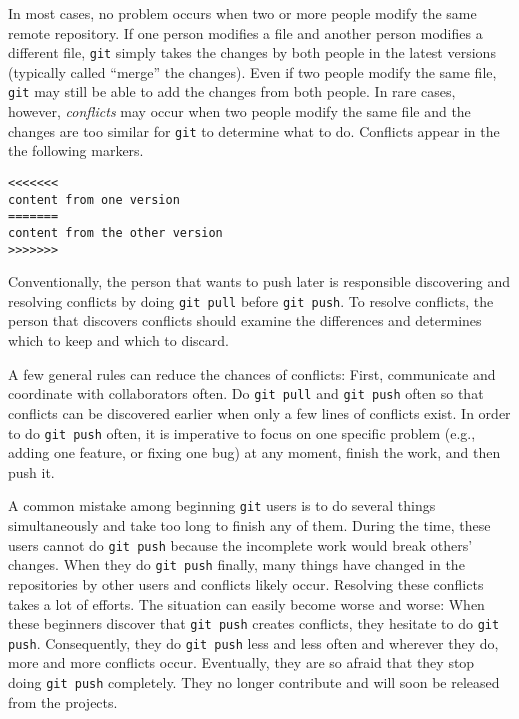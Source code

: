 In most cases, no problem occurs when two or more people modify the
same remote repository. If one person modifies a file and another
person modifies a different file, {\tt git} simply takes the changes
by both people in the latest versions (typically called ``merge'' the
changes).  Even if two people modify the same file, {\tt git} may
still be able to add the changes from both people.  In rare cases,
however, {\it conflicts} may occur when two people modify the same
file and the changes are too similar for {\tt git} to determine what
to do.  Conflicts appear in the the following markers.


\begin{verbatim}
<<<<<<< 
content from one version
=======
content from the other version
>>>>>>> 
\end{verbatim}


Conventionally, the person that wants to push later is responsible
discovering and resolving conflicts by doing {\tt git pull} before
{\tt git push}.  To resolve conflicts, the person that discovers
conflicts should examine the differences and determines which to keep
and which to discard.

A few general rules can reduce the chances of conflicts:
First,  communicate and coordinate with collaborators often.
Do {\tt git pull} and {\tt git push} often so that conflicts can
  be discovered earlier when only a few lines of conflicts exist.
 In order to do {\tt git push} often, it is imperative to focus
  on one specific problem (e.g., adding one feature, or fixing one
  bug) at any moment, finish the work, and then push it.


  A common mistake among beginning {\tt git} users is to do several
  things simultaneously and take too long to finish any of them.
  During the time, these users cannot do {\tt git push} because the
  incomplete work would break others' changes. When they do {\tt git
    push} finally, many things have changed in the repositories by
  other users and conflicts likely occur. Resolving these conflicts
  takes a lot of efforts.  The situation can easily become worse and
  worse: When these beginners discover that {\tt git push} creates
  conflicts, they hesitate to do {\tt git push}. Consequently, they do
  {\tt git push} less and less often and wherever they do, more and
  more conflicts occur.  Eventually, they are so afraid that they stop
  doing {\tt git push} completely. They no longer contribute and will
  soon be released from the projects.

